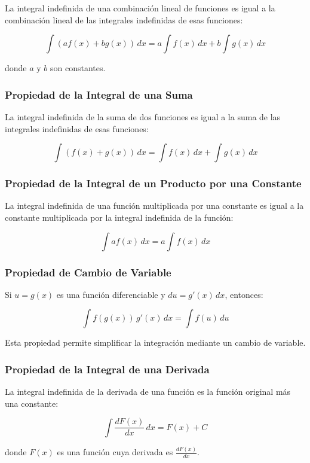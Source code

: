 La integral indefinida de una combinación lineal de funciones es igual a la combinación lineal de las integrales indefinidas de esas funciones:

\[
\int \left( a f(x) + b g(x) \right) \, dx = a \int f(x) \, dx + b \int g(x) \, dx
\]

donde \( a \) y \( b \) son constantes.

\subsubsection{Propiedad de la Integral de una Suma}

La integral indefinida de la suma de dos funciones es igual a la suma de las integrales indefinidas de esas funciones:

\[
\int \left( f(x) + g(x) \right) \, dx = \int f(x) \, dx + \int g(x) \, dx
\]

\subsubsection{Propiedad de la Integral de un Producto por una Constante}

La integral indefinida de una función multiplicada por una constante es igual a la constante multiplicada por la integral indefinida de la función:

\[
\int a f(x) \, dx = a \int f(x) \, dx
\]

\subsubsection{Propiedad de Cambio de Variable}

Si \( u = g(x) \) es una función diferenciable y \( du = g'(x) \, dx \), entonces:

\[
\int f(g(x)) \, g'(x) \, dx = \int f(u) \, du
\]

Esta propiedad permite simplificar la integración mediante un cambio de variable.

\subsubsection{Propiedad de la Integral de una Derivada}

La integral indefinida de la derivada de una función es la función original más una constante:

\[
\int \frac{dF(x)}{dx} \, dx = F(x) + C
\]

donde \( F(x) \) es una función cuya derivada es \( \frac{dF(x)}{dx} \).


